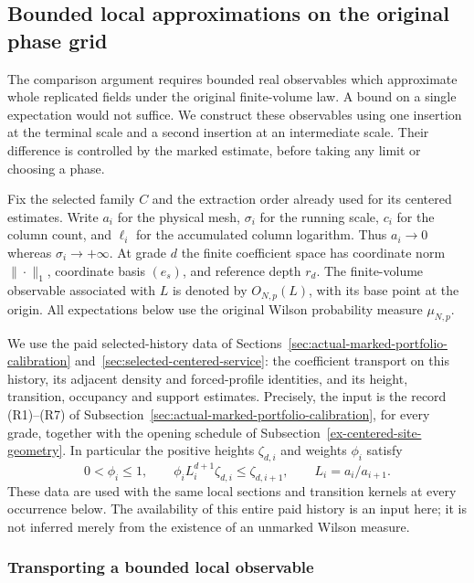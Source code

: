 \subsection{Bounded local approximations on the original phase grid}
\label{sec:actual-phase-grid-approximants}

The comparison argument requires bounded real observables which approximate
whole replicated fields under the original finite-volume law. A bound on a
single expectation would not suffice. We construct these observables using
one insertion at the terminal scale and a second insertion at an intermediate
scale. Their difference is controlled by the marked estimate, before taking
any limit or choosing a phase.

Fix the selected family $C$ and the extraction order already used for its
centered estimates. Write $a_i$ for the physical mesh, $\sigma_i$ for the
running scale, $c_i$ for the column count, and $\ell_i$ for the accumulated
column logarithm. Thus $a_i\to0$ whereas $\sigma_i\to+\infty$.
At grade $d$ the finite coefficient space has coordinate norm $\|\cdot\|_1$,
coordinate basis $(e_s)$, and reference depth $r_d$. The finite-volume
observable associated with $L$ is denoted by $O_{N,p}(L)$, with its base
point at the origin. All expectations below use the original Wilson
probability measure $\mu_{N,p}$.

We use the paid selected-history data of
Sections~\ref{sec:actual-marked-portfolio-calibration}
and~\ref{sec:selected-centered-service}: the coefficient transport on this
history, its adjacent density and forced-profile identities, and its height,
transition, occupancy and support estimates. Precisely, the input is the
record (R1)--(R7) of
Subsection~\ref{sec:actual-marked-portfolio-calibration}, for every grade,
together with the opening schedule of
Subsection~\ref{ex-centered-site-geometry}. In particular the positive
heights $\zeta_{d,i}$ and weights $\phi_i$ satisfy
\[
 0<\phi_i\leq1,\qquad
 \phi_i L_i^{d+1}\zeta_{d,i}\leq\zeta_{d,i+1},\qquad
 L_i=a_i/a_{i+1}.
\]
These data are used with the same local sections and transition kernels at
every occurrence below. The availability of this entire paid history is an
input here; it is not inferred merely from the existence of an unmarked
Wilson measure.

\subsubsection{Transporting a bounded local observable}

